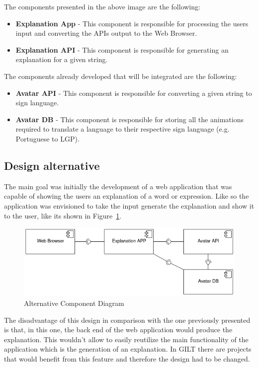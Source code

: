 The components presented in the above image are the following:

\begin{itemize}
    \item \textbf{Explanation App} - This component is responsible for processing the users input and converting the APIs output to the Web Browser.
    \item \textbf{Explanation API} - This component is responsible for generating an explanation for a given string.
\end{itemize}

The components already developed that will be integrated are the following:
\begin{itemize}
    \item \textbf{Avatar API} - This component is responsible for converting a given string to sign language.
    \item \textbf{Avatar DB} - This component is responsible for storing all the animations required to translate a language to their respective sign language (e.g. Portuguese to \gls{LGP}).
\end{itemize}

\subsection{Design alternative}

The main goal was initially the development of a web application that was capable of showing the users an explanation of a word or expression.
Like so the application was envisioned to take the input generate the explanation and show it to the user, like its shown in Figure~\ref{fig:ocd}.

\begin{figure}[H]
\centering
\includegraphics[width=\textwidth,keepaspectratio]{ch4/assets/component_diagram_alternative.png}
\caption[Alternative Component Diagram]{Alternative Component Diagram}
\label{fig:ocd}
\end{figure}

The disadvantage of this design in comparison with the one previously presented is that, in this one, the back end of the web application would produce the explanation.
This wouldn't allow to easily reutilize the main functionality of the application which is the generation of an explanation.
In GILT there are projects that would benefit from this feature and therefore the design had to be changed.

